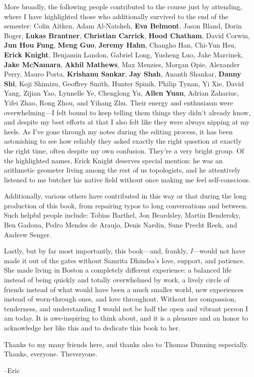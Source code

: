More broadly, the following people contributed to the course just by attending, where I have highlighted those who additionally survived to the end of the semester: Colin Aitken, Adam Al-Natsheh, \textbf{Eva Belmont}, Jason Bland, Dorin Boger, \textbf{Lukas Brantner}, \textbf{Christian Carrick}, \textbf{Hood Chatham}, David Corwin, \textbf{Jun Hou Fung}, \textbf{Meng Guo}, \textbf{Jeremy Hahn}, Changho Han, Chi-Yun Hsu, \textbf{Erick Knight}, Benjamin Landon, Gabriel Long, Yusheng Luo, Jake Marcinek, \textbf{Jake McNamara}, \textbf{Akhil Mathews}, Max Menzies, Morgan Opie, Alexander Perry, Mauro Porta, \textbf{Krishanu Sankar}, \textbf{Jay Shah}, Ananth Shankar, \textbf{Danny Shi}, Koji Shimizu, Geoffrey Smith, Hunter Spinik, Philip Tynan, Yi Xie, David Yang, Zijian Yao, Lynnelle Ye, Chenglong Yu, \textbf{Allen Yuan}, Adrian Zahariuc, Yifei Zhao, Rong Zhou, and Yihang Zhu.  Their energy and enthusiasm were overwhelming---I felt bound to keep telling them things they didn't already know, and despite my best efforts at that I also felt like they were always nipping at my heels.  As I've gone through my notes during the editing process, it has been astonishing to see how reliably they asked exactly the right question at exactly the right time, often despite my own confusion.  They're a very bright group.  Of the highlighted names, Erick Knight deserves special mention: he was an arithmetic geometer living among the rest of us topologists, and he attentively listened to me butcher his native field without once making me feel self-conscious.

Additionally, various others have contributed in this way or that during the long production of this book, from repairing typos to long conversations and between.  Such helpful people include: Tobias Barthel, Jon Beardsley, Martin Bendersky, Ben Gadoua, Pedro Mendes de Araujo, Denis Nardin, Sune Precht Reeh, and Andrew Senger.

Lastly, but by far most importantly, this book---and, frankly, \emph{I}---would not have made it out of the gates without Samrita Dhindsa's love, support, and patience.  She made living in Boston a completely different experience: a balanced life instead of being quickly and totally overwhelmed by work, a lively circle of friends instead of what would have been a much smaller world, new experiences instead of worn-through ones, and love throughout.  Without her compassion, tenderness, and understanding I would not be half the open and vibrant person I am today.  It is awe-inspiring to think about, and it is a pleasure and an honor to acknowledge her like this and to dedicate this book to her.

Thanks to my many friends here, and thanks also to Thomas Dunning especially.  Thanks, everyone.  Theveryone.

\vspace{2\baselineskip}
\hspace{3em} --Eric
